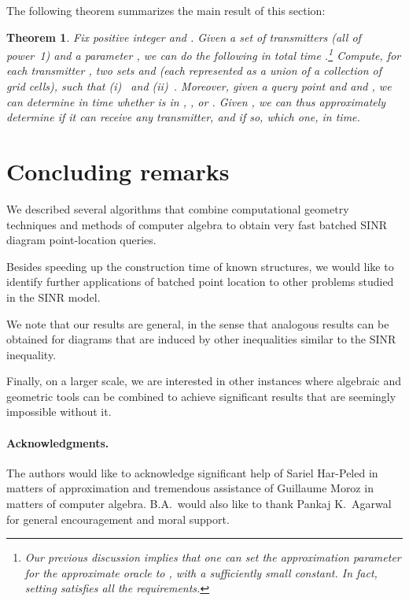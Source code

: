 \documentclass[11pt]{article}
\newtheorem{theorem}{Theorem}[section]
\theoremstyle{remark}
\begin{document}
The following theorem summarizes the main result of this section:
\begin{theorem}
Fix positive integer  and .
Given a set  of  transmitters (all of power~1) and a parameter ,
we can do the following in total time .\footnote{Our previous discussion implies that one can set the approximation parameter  for the approximate oracle to , with 
 a sufficiently small constant.  In fact, 
setting  satisfies all the requirements.}
Compute, for each transmitter , two sets  and  (each represented as a union of a collection of grid cells), such that
(i)~ and (ii)~.
Moreover, given a query point  and  and , we can determine in  time whether  is in , , or .  Given , we can thus approximately determine if it can receive any transmitter, and if so, which one, in  time. 
\end{theorem}













\section{Concluding remarks}
\label{sec:conl}

We described several algorithms that combine computational geometry techniques and methods of computer algebra to obtain very fast batched SINR diagram point-location queries.



Besides speeding up the construction time of known structures, we would like to identify further applications of batched point location to other problems studied in the SINR model.

We note that our results are general, in the sense that analogous results can be obtained for diagrams that are induced by other inequalities similar to the SINR inequality. 

Finally, on a larger scale, we are interested in other instances where algebraic and geometric tools can be combined to achieve significant results that are seemingly impossible without it.

\paragraph*{Acknowledgments.}
The authors would like to acknowledge significant help of Sariel Har-Peled in matters of approximation and tremendous assistance of Guillaume Moroz in matters of computer algebra.  B.A.\ would also like to thank Pankaj K.\ Agarwal for general encouragement and moral support.
\end{document}

